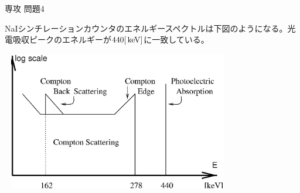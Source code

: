 \documentclass[fleqn]{jbook}
\begin{document}
\begin{answer}{専攻 問題4}{}
\begin{subanswers}
\begin{subsubanswers}
\SubAnswer
NaIシンチレーションカウンタのエネルギースペクトルは下図のようになる。光電吸収ピークのエネルギーが$440[{\,{\rm keV}}]$に一致している。
\begin{center}
\includegraphics[clip,width=102mm,height=61mm]{1997phy4-5.eps}
\end{center}

\end{subsubanswers}
\end{subanswers}
\end{answer}
\end{document}
